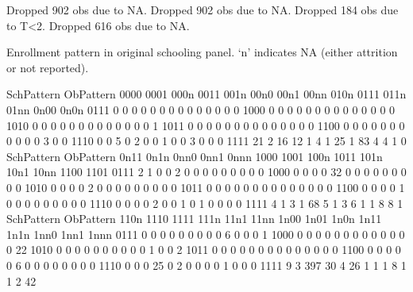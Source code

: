 \begin{Schunk}
\begin{Soutput}
Dropped 902 obs due to NA.
Dropped 902 obs due to NA.
Dropped 184 obs due to T<2.
Dropped 616 obs due to NA.
\end{Soutput}
\end{Schunk}
Enrollment pattern in original schooling panel. `n' indicates NA (either attrition or not reported).
\begin{Schunk}
\begin{Soutput}
         SchPattern
ObPattern 0000 0001 000n 0011 001n 00n0 00n1 00nn 010n 0111 011n 01nn 0n00 0n0n
     0111    0    0    0    0    0    0    0    0    0    0    0    0    0    0
     1000    0    0    0    0    0    0    0    0    0    0    0    0    0    0
     1010    0    0    0    0    0    0    0    0    0    0    0    0    0    1
     1011    0    0    0    0    0    0    0    0    0    0    0    0    0    0
     1100    0    0    0    0    0    0    0    0    0    0    0    3    0    0
     1110    0    0    5    0    2    0    0    1    0    0    3    0    0    0
     1111   21    2   16   12    1    4    1   25    1   83    4    4    1    0
         SchPattern
ObPattern 0n11 0n1n 0nn0 0nn1 0nnn 1000 1001 100n 1011 101n 10n1 10nn 1100 1101
     0111    2    1    0    0    2    0    0    0    0    0    0    0    0    0
     1000    0    0    0    0   32    0    0    0    0    0    0    0    0    0
     1010    0    0    0    0    2    0    0    0    0    0    0    0    0    0
     1011    0    0    0    0    0    0    0    0    0    0    0    0    0    0
     1100    0    0    0    0    1    0    0    0    0    0    0    0    0    0
     1110    0    0    0    0    2    0    0    1    0    1    0    0    0    0
     1111    4    1    3    1   68    5    1    3    6    1    1    8    8    1
         SchPattern
ObPattern 110n 1110 1111 111n 11n1 11nn 1n00 1n01 1n0n 1n11 1n1n 1nn0 1nn1 1nnn
     0111    0    0    0    0    0    0    0    0    0    6    0    0    0    1
     1000    0    0    0    0    0    0    0    0    0    0    0    0    0   22
     1010    0    0    0    0    0    0    0    0    0    0    1    0    0    2
     1011    0    0    0    0    0    0    0    0    0    0    0    0    0    0
     1100    0    0    0    0    0    6    0    0    0    0    0    0    0    0
     1110    0    0    0   25    0    2    0    0    0    0    1    0    0    0
     1111    9    3  397   30    4   26    1    1    1    8    1    1    2   42
\end{Soutput}
\end{Schunk}
